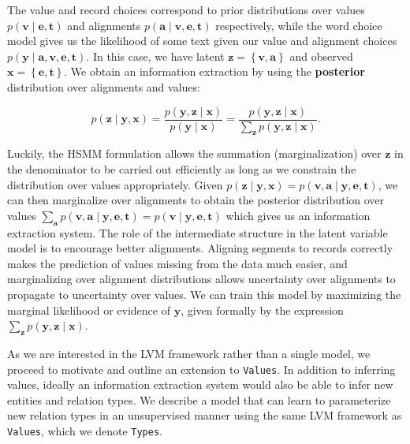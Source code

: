 \documentclass[11pt]{article}
\newcommand\set[1]{\left\{#1\right\}}
\newcommand{\ba}{\mathbf{a}}
\newcommand{\be}{\mathbf{e}}
\newcommand{\bt}{\mathbf{t}}
\newcommand{\bv}{\mathbf{v}}
\newcommand{\bx}{\mathbf{x}}
\newcommand{\by}{\mathbf{y}}
\newcommand{\bz}{\mathbf{z}}
\begin{document}
The value and record choices correspond to prior distributions over values $p(\bv\mid\be,\bt)$ and alignments $p(\ba\mid\bv,\be,\bt)$ respectively,
while the word choice model gives us the likelihood of some text given our value and alignment choices $p(\by\mid\ba,\bv,\be,\bt)$.
In this case, we have latent $\bz = \set{\bv,\ba}$ and observed $\bx = \set{\be,\bt}$.
We obtain an information extraction by using the 
\textbf{posterior} distribution over alignments and values:
\begin{linenomath*}
$$
p(\bz\mid\by,\bx)=\frac{p(\by,\bz\mid\bx)}{p(\by\mid\bx)}=\frac{p(\by,\bz\mid\bx)}{\sum_\bz p(\by,\bz\mid\bx)}.
$$
\end{linenomath*}
Luckily, the HSMM formulation allows the summation (marginalization) over $\bz$ in the denominator to be carried out efficiently
as long as we constrain the distribution over values appropriately.
Given $p(\bz\mid\by,\bx)=p(\bv,\ba\mid\by,\be,\bt)$, we can then marginalize over alignments
to obtain the posterior distribution over values $\sum_\ba p(\bv,\ba\mid\by,\be,\bt)=p(\bv\mid\by,\be,\bt)$
which gives us an information extraction system.
The role of the intermediate structure in the latent variable model is to encourage better alignments.
Aligning segments to records correctly makes the prediction of values missing from the data much easier,
and marginalizing over alignment distributions allows uncertainty over alignments
to propagate to uncertainty over values.
We can train this model by maximizing the marginal likelihood or evidence of $\by$,
given formally by the expression $\sum_\bz p(\by,\bz\mid\bx)$.

As we are interested in the LVM framework rather than a single model,
we proceed to motivate and outline an extension to \texttt{Values}.
In addition to inferring values, ideally an information extraction system 
would also be able to infer new entities and relation types.
We describe a model that can learn to parameterize new relation types in an
unsupervised manner using the same LVM framework as \texttt{Values},
which we denote \texttt{Types}.
\end{document}

